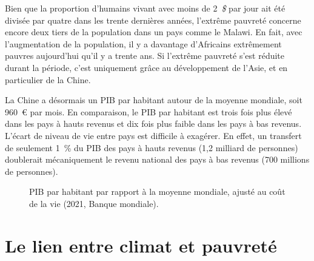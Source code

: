 \documentclass[a5paper,french,openany]{memoir}
\begin{document}
Bien que la proportion d'humains vivant avec moins de 2~\textit{\$} par jour ait été divisée par quatre dans les trente dernières années, l'extrême pauvreté concerne encore deux tiers de la population dans un pays comme le Malawi. En fait, avec l'augmentation de la population, il y a davantage d'Africains extrêmement pauvres aujourd'hui qu'il y a trente ans. Si l'extrême pauvreté s'est réduite durant la période, c'est uniquement grâce au développement de l'Asie, et en particulier de la Chine. %

La Chine a désormais un PIB par habitant autour de la moyenne mondiale, soit 960~\euro{} par mois. %
En comparaison, le PIB par habitant est trois fois plus élevé dans les pays à hauts revenus et dix fois plus faible dans les pays à bas revenus. L'écart de niveau de vie entre pays est difficile à exagérer. En effet, un transfert de seulement 1~\% du PIB des pays à hauts revenus (1,2 milliard de personnes) doublerait mécaniquement le revenu national des pays à bas revenus (700 millions de personnes). 

\begin{figure}[h!]
  \caption[Inégalités de PIB par habitant]{PIB par habitant par rapport à la moyenne mondiale, ajusté au coût de la vie (2021, Banque mondiale). %
  }\label{fig:GDPpc}
\end{figure}

\section{Le lien entre climat et pauvreté} 
\end{document}
